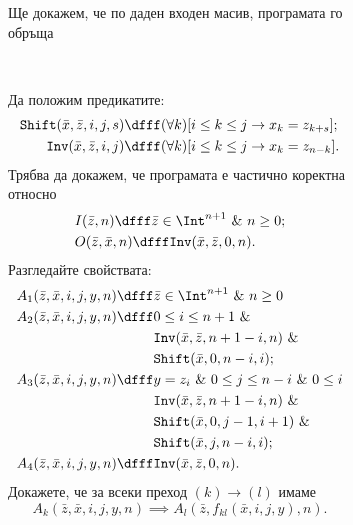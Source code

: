 \begin{figure}[H]
\begin{subfigure}[b]{0.6\textwidth}
  \caption{Ще докажем, че по даден входен масив, програмата го обръща}
  \end{subfigure}
  ~
  \qquad
  \begin{subfigure}[b]{0.6\textwidth}
    \footnotesize{
      Да положим предикатите:
      \begin{align*}
        \texttt{Shift}(\bar{x},\bar{z},i,j,s) & \dfff  (\forall k)[i \leq k \leq j \to x_k = z_{k+s}];\\
        \texttt{Inv}(\bar{x},\bar{z},i,j) & \dfff (\forall k)[i \leq k \leq j \to x_k = z_{n-k}].
      \end{align*}
      Трябва да докажем, че програмата е частично коректна относно 
      \begin{align*}
        & I(\bar{z},n) \dfff \bar{z} \in \Int^{n+1}\ \&\ n \geq 0;\\
        & O(\bar{z},\bar{x},n) \dfff \texttt{Inv}(\bar{x},\bar{z},0,n).
      \end{align*}
      Разгледайте свойствата:
      \begin{align*}
        A_1(\bar{z},\bar{x},i,j,y,n) \dfff & \bar{z} \in \Int^{n+1}\ \&\ n \geq 0\\
        A_2(\bar{z},\bar{x},i,j,y,n) \dfff & 0 \leq i \leq n+1\ \&\\
        & \texttt{Inv}(\bar{x},\bar{z},n+1-i,n)\ \&\\
        & \texttt{Shift}(\bar{x},0,n-i,i);\\
        A_3(\bar{z},\bar{x},i,j,y,n) \dfff & y = z_i\ \&\ 0 \leq j \leq n-i\ \&\ 0 \leq i\\
        & \texttt{Inv}(\bar{x},\bar{z},n+1-i,n)\ \&\\
        & \texttt{Shift}(\bar{x},0,j-1,i+1)\ \&\\
        & \texttt{Shift}(\bar{x},j,n-i,i);\\
        A_4(\bar{z},\bar{x},i,j,y,n) \dfff & \texttt{Inv}(\bar{x},\bar{z},0,n).
      \end{align*}
      Докажете, че за всеки преход $(k) \to (l)$ имаме
      \[A_k(\bar{z},\bar{x},i,j,y,n) \implies A_l(\bar{z},f_{kl}(\bar{x},i,j,y),n).\]
    }
  \end{subfigure}
\end{figure}



